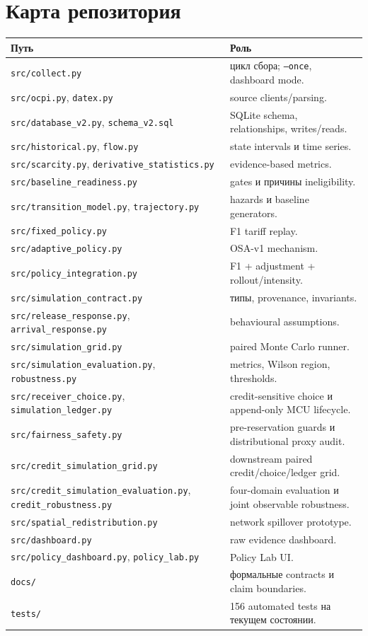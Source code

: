 \documentclass[11pt,a4paper]{article}
\newcommand{\code}[1]{\texttt{#1}}
\begin{document}
\section{Карта репозитория}
\begin{longtable}{p{5.3cm}p{10.7cm}}
\toprule Путь & Роль \\\midrule\endhead
\code{src/collect.py} & цикл сбора; \code{--once}, dashboard mode.\\
\code{src/ocpi.py}, \code{datex.py} & source clients/parsing.\\
\code{src/database\_v2.py}, \code{schema\_v2.sql} & SQLite schema, relationships, writes/reads.\\
\code{src/historical.py}, \code{flow.py} & state intervals и time series.\\
\code{src/scarcity.py}, \code{derivative\_statistics.py} & evidence-based metrics.\\
\code{src/baseline\_readiness.py} & gates и причины ineligibility.\\
\code{src/transition\_model.py}, \code{trajectory.py} & hazards и baseline generators.\\
\code{src/fixed\_policy.py} & F1 tariff replay.\\
\code{src/adaptive\_policy.py} & OSA-v1 mechanism.\\
\code{src/policy\_integration.py} & F1 + adjustment + rollout/intensity.\\
\code{src/simulation\_contract.py} & типы, provenance, invariants.\\
\code{src/release\_response.py}, \code{arrival\_response.py} & behavioural assumptions.\\
\code{src/simulation\_grid.py} & paired Monte Carlo runner.\\
\code{src/simulation\_evaluation.py}, \code{robustness.py} & metrics, Wilson region, thresholds.\\
\code{src/receiver\_choice.py}, \code{simulation\_ledger.py} & credit-sensitive choice и append-only MCU lifecycle.\\
\code{src/fairness\_safety.py} & pre-reservation guards и distributional proxy audit.\\
\code{src/credit\_simulation\_grid.py} & downstream paired credit/choice/ledger grid.\\
\code{src/credit\_simulation\_evaluation.py}, \code{credit\_robustness.py} & four-domain evaluation и joint observable robustness.\\
\code{src/spatial\_redistribution.py} & network spillover prototype.\\
\code{src/dashboard.py} & raw evidence dashboard.\\
\code{src/policy\_dashboard.py}, \code{policy\_lab.py} & Policy Lab UI.\\
\code{docs/} & формальные contracts и claim boundaries.\\
\code{tests/} & 156 automated tests на текущем состоянии.\\
\bottomrule
\end{longtable}
\end{document}
